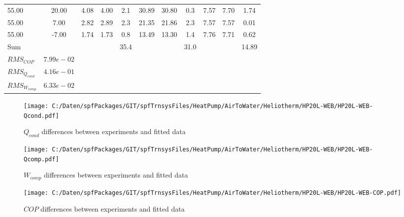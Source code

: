 \documentclass[english]{SPFShortReport}
\begin{document}
\begin{table}[!ht]
\begin{small}
\begin{center}
{\begin{tabular}{l | c c c c c c c c c c }
55.00  & 20.00 & 4.08 & 4.00 & 2.1 & 30.89 & 30.80 & 0.3 & 7.57 & 7.70 & 1.74\\ 
55.00  & 7.00 & 2.82 & 2.89 & 2.3 & 21.35 & 21.86 & 2.3 & 7.57 & 7.57 & 0.01\\ 
55.00  & -7.00 & 1.74 & 1.73 & 0.8 & 13.49 & 13.30 & 1.4 & 7.76 & 7.71 & 0.62\\ 
\hline 
 Sum &  & &  & 35.4 &  &  & 31.0 & &  & 14.89\\ 
\hline 
 $RMS_{COP}$ & $7.99e-02$ \\ 
 $RMS_{Q_{cond}}$ & $4.16e-01$ \\ 
 $RMS_{W_{comp}}$ & $6.33e-02$ \\ 
\hline
\hline
\end{tabular}
}
\label{ErrorsTable}
\end{center}
\end{small}
\end{table}
\begin{figure}[!ht]
\begin{center}
\texttt{[image: C:/Daten/spfPackages/GIT/spfTrnsysFiles/HeatPump/AirToWater/Heliotherm/HP20L-WEB/HP20L-WEB-Qcond.pdf]}
\caption{$Q_{cond}$ differences between experiments and fitted data}
\label{QcongFig}
\end{center}
\end{figure}
\begin{figure}[!ht]
\begin{center}
\texttt{[image: C:/Daten/spfPackages/GIT/spfTrnsysFiles/HeatPump/AirToWater/Heliotherm/HP20L-WEB/HP20L-WEB-Qcomp.pdf]}
\caption{$W_{comp}$ differences between experiments and fitted data}
\label{QcompFig}
\end{center}
\end{figure}
\begin{figure}[!ht]
\begin{center}
\texttt{[image: C:/Daten/spfPackages/GIT/spfTrnsysFiles/HeatPump/AirToWater/Heliotherm/HP20L-WEB/HP20L-WEB-COP.pdf]}
\caption{$COP$ differences between experiments and fitted data}
\label{COPFig}
\end{center}
\end{figure}
\end{document}
